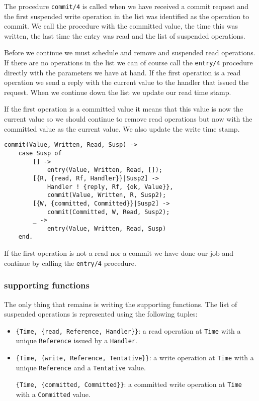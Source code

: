 \documentclass[a4paper, 11pt]{article}
\begin{document}
The procedure {\tt commit/4} is called when we have received a commit
request and the first suspended write operation in the list was
identified as the operation to commit. We call the procedure with the
committed value, the time this was written, the last time the entry was
read and the list of suspended operations.

Before we continue we must schedule and remove and suspended read
operations. If there are no operations in the list we can of course
call the {\tt entry/4} procedure directly with the parameters we have
at hand. If the first operation is a read operation we send a reply
with the current value to the handler that issued the request. When we
continue down the list we update our read time stamp.

If the first operation is a committed value it means that this value is
now the current value so we should continue to remove read operations
but now with the committed value as the current value. We also update
the write time stamp.

\begin{verbatim}
commit(Value, Written, Read, Susp) ->
    case Susp of
        [] ->
            entry(Value, Written, Read, []);
        [{R, {read, Rf, Handler}}|Susp2] ->
            Handler ! {reply, Rf, {ok, Value}},
            commit(Value, Written, R, Susp2);
        [{W, {committed, Committed}}|Susp2] ->
            commit(Committed, W, Read, Susp2);      
        _ ->
            entry(Value, Written, Read, Susp)
    end.
\end{verbatim}

If the first operation is not a read nor a commit we have done our job
and continue by calling the {\tt entry/4} procedure.

\subsubsection{supporting functions}

The only thing that remains is writing the supporting functions. The
list of suspended operations is represented using the following tuples:

\begin{itemize} 
\item {\tt \{Time, \{read, Reference, Handler\}\}}: a read operation
  at {\tt Time} with a unique {\tt Reference} issued by a {\tt Handler}.

\item {\tt \{Time, \{write, Reference, Tentative\}\}}: a write operation
  at {\tt Time} with a unique {\tt Reference} and a {\tt Tentative} value.

{\tt \{Time, \{committed, Committed\}\}}: a committed write operation
  at {\tt Time} with a {\tt Committed} value.
\end{itemize} 
\end{document}
